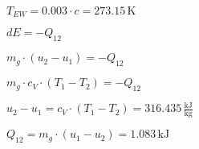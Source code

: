 \( T_{EW} = 0.003 \cdot c = 273.15 \, \text{K} \)  

\( dE = -Q_{12} \)  

\( m_g \cdot (u_2 - u_1) = -Q_{12} \)  

\( m_g \cdot c_V \cdot (T_1 - T_2) = -Q_{12} \)  

\( u_2 - u_1 = c_V \cdot (T_1 - T_2) = 316.435 \, \frac{\text{kJ}}{\text{kg}} \)  

\( Q_{12} = m_g \cdot (u_1 - u_2) = 1.083 \, \text{kJ} \)